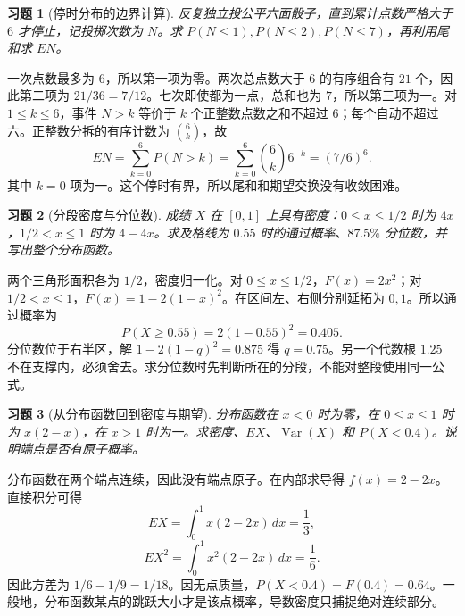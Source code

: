 \documentclass[UTF8,12pt,a4paper,fontset=fandol]{ctexart}
\newtheorem{exercise}{习题}[section]
\begin{document}
\begin{exercise}[停时分布的边界计算]\label{q:M-PF-19}
反复独立投公平六面骰子，直到累计点数严格大于 $6$ 才停止，记投掷次数为 $N$。求 $P(N\le1),P(N\le2),P(N\le7)$，再利用尾和求 $EN$。\par{}
\end{exercise}

\begin{solve}\label{a:M-PF-19}一次点数最多为 $6$，所以第一项为零。两次总点数大于 $6$ 的有序组合有 $21$ 个，因此第二项为 $21/36=7/12$。七次即使都为一点，总和也为 $7$，所以第三项为一。对 $1\le k\le6$，事件 $N>k$ 等价于 $k$ 个正整数点数之和不超过 $6$；每个自动不超过六。正整数分拆的有序计数为 $\binom6k$，故\[EN=\sum_{k=0}^6P(N>k)=\sum_{k=0}^6\binom6k6^{-k}=(7/6)^6.\]其中 $k=0$ 项为一。这个停时有界，所以尾和和期望交换没有收敛困难。\end{solve}

\begin{exercise}[分段密度与分位数]\label{q:M-PF-20}
成绩 $X$ 在 $[0,1]$ 上具有密度：$0\le x\le1/2$ 时为 $4x$，$1/2<x\le1$ 时为 $4-4x$。求及格线为 $0.55$ 时的通过概率、$87.5\%$ 分位数，并写出整个分布函数。\par{}
\end{exercise}

\begin{solve}\label{a:M-PF-20}两个三角形面积各为 $1/2$，密度归一化。对 $0\le x\le1/2$，$F(x)=2x^2$；对 $1/2<x\le1$，$F(x)=1-2(1-x)^2$。在区间左、右侧分别延拓为 $0,1$。所以通过概率为\[P(X\ge0.55)=2(1-0.55)^2=0.405.\]分位数位于右半区，解 $1-2(1-q)^2=0.875$ 得 $q=0.75$。另一个代数根 $1.25$ 不在支撑内，必须舍去。求分位数时先判断所在的分段，不能对整段使用同一公式。\end{solve}

\begin{exercise}[从分布函数回到密度与期望]\label{q:M-PF-21}
分布函数在 $x<0$ 时为零，在 $0\le x\le1$ 时为 $x(2-x)$，在 $x>1$ 时为一。求密度、$EX$、$\operatorname{Var}(X)$ 和 $P(X<0.4)$。说明端点是否有原子概率。\par{}
\end{exercise}

\begin{solve}\label{a:M-PF-21}分布函数在两个端点连续，因此没有端点原子。在内部求导得 $f(x)=2-2x$。直接积分可得\[EX=\int_0^1x(2-2x)\,dx=\frac13,\]\[EX^2=\int_0^1x^2(2-2x)\,dx=\frac16.\]因此方差为 $1/6-1/9=1/18$。因无点质量，$P(X<0.4)=F(0.4)=0.64$。一般地，分布函数某点的跳跃大小才是该点概率，导数密度只捕捉绝对连续部分。\end{solve}
\end{document}

